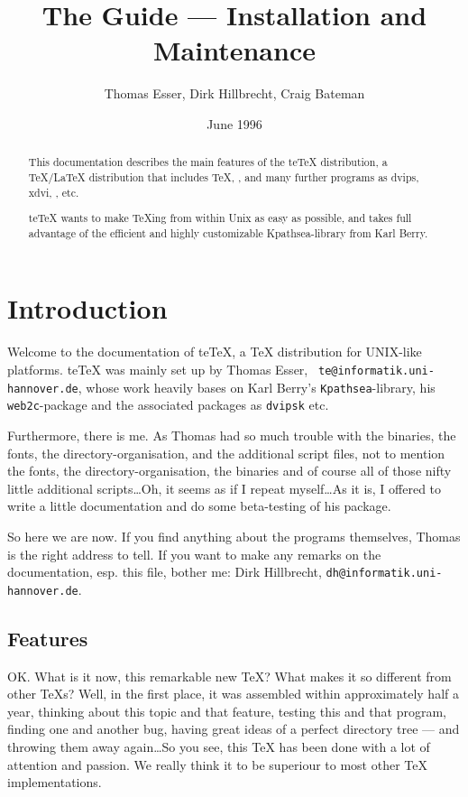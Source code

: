 \documentclass[12pt,a4paper]{article}
\title{The \teTeX{} Guide --- Installation and Maintenance}
\author{Thomas Esser, Dirk Hillbrecht, Craig Bateman}
\date{June 1996}
\newcommand{\teTeX}{\textrm{te}\TeX\xspace}
\begin{document}
\maketitle

\begin{abstract}

  This documentation describes the main features of the
  \teTeX distribution, a \TeX{}/\LaTeX{} distribution
  that includes \TeX{}, \LaTeXe{}, \MF{} and many further
  programs as dvips, xdvi, \BibTeX{}, etc.

  \teTeX{} wants to make \TeX{}ing from within Unix as easy as
  possible, and takes full advantage of the efficient and highly
  customizable Kpathsea-library from Karl Berry.

\end{abstract}

\tableofcontents

\newpage

\section{Introduction}
\label{sec:int}

Welcome to the documentation of
\teTeX{}, a \TeX{} distribution for UNIX-like platforms.
\teTeX{} was mainly set up by Thomas Esser, {\tt
  te@informatik.uni-hannover.de}, whose work heavily bases on Karl
Berry's {\tt Kpathsea}-library, his {\tt web2c}-package and the
associated packages as {\tt dvipsk} etc.

Furthermore, there is me. As Thomas had so much trouble with the
binaries, the fonts, the directory-organisation, and the additional
script files, not to mention the fonts, the directory-organisation,
the binaries and of course all of those nifty little additional
scripts\dots Oh, it seems as if I repeat myself\dots As it is, I
offered to write a little documentation and do some beta-testing
of his package.

So here we are now. If you find anything about the programs
themselves, Thomas is the right address to tell.  If you want to make
any remarks on the documentation, esp. this file, bother me: Dirk
Hillbrecht, {\tt dh@informatik.uni-hannover.de}.

\subsection{Features}
\label{ssec:fea}

OK. What is it now, this remarkable new \TeX{}? What makes it so
different from other \TeX{}s? Well, in the first place, it was
assembled within approximately half a year, thinking about this topic
and that feature, testing this and that program, finding one and
another bug, having great ideas of a perfect directory tree --- and
throwing them away again\dots So you see, this \TeX{} has been done
with a lot of attention and passion. We really think it to be superiour
to most other \TeX{} implementations.
\end{document}
